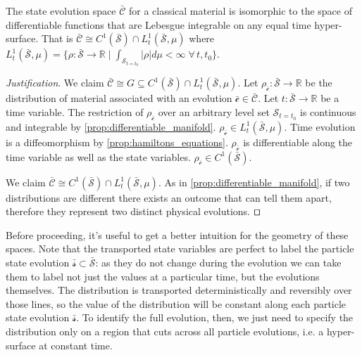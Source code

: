\documentclass[smallextended]{svjour3}
\numberwithin{equation}{section}
\newenvironment{justification}{\emph{Justification}.}{\hfill\(\qed\)}
\begin{document}
\begin{prop}\label{prop:state_evolution_space}
	The state evolution space $\bar{\mathcal{C}}$ for a classical material is isomorphic to the space of differentiable functions that are Lebesgue integrable on any equal time hyper-surface. That is $\bar{\mathcal{C}} \cong  C^1(\bar{\mathcal{S}})\cap L^1_t(\bar{\mathcal{S}}, \mu)$ where $L^1_t(\bar{\mathcal{S}}, \mu)=\{{\rho: \bar{\mathcal{S}} \rightarrow \mathbb{R}} \; | \; {\int_{\mathcal{S}_{t=t_0}} |\rho| d\mu < \infty} \; \forall \, t, t_0 \}$.
\end{prop}

\begin{justification}
	We claim $\bar{\mathcal{C}} \cong  G \subseteq C^1(\bar{\mathcal{S}})\cap L^1_t(\bar{\mathcal{S}}, \mu)$. Let $\rho_{\bar{\mathcal{c}}} : \bar{\mathcal{S}} \rightarrow \mathbb{R}$ be the distribution of material associated with an evolution $\bar{\mathcal{c}} \in \bar{\mathcal{C}}$. Let $t : \bar{\mathcal{S}} \rightarrow \mathbb{R}$ be a time variable. 
	The restriction of $\rho_{\bar{\mathcal{c}}}$ over an arbitrary level set $\mathcal{S}_{t=t_0}$ is continuous and integrable by \ref{prop:differentiable_manifold}. $\rho_{\bar{\mathcal{c}}} \in L^1_t(\bar{\mathcal{S}}, \mu)$. Time evolution is a diffeomorphism by \ref{prop:hamiltons_equations}. $\rho_{\bar{\mathcal{c}}}$ is differentiable along the time variable as well as the state variables. $\rho_{\bar{\mathcal{c}}} \in C^1(\bar{\mathcal{S}})$.
	
	We claim $\bar{\mathcal{C}} \cong  C^1(\bar{\mathcal{S}})\cap L^1_t(\bar{\mathcal{S}}, \mu)$. As in \ref{prop:differentiable_manifold}, if two distributions are different there exists an outcome that can tell them apart, therefore they represent two distinct physical evolutions.
\end{justification}

Before proceeding, it's useful to get a better intuition for the geometry of these spaces. Note that the transported state variables are perfect to label the particle state evolution $\bar{\mathcal{s}} \subset \bar{\mathcal{S}}$: as they do not change during the evolution we can take them to label not just the values at a particular time, but the evolutions themselves. The distribution is transported deterministically and reversibly over those lines, so the value of the distribution will be constant along each particle state evolution $\bar{\mathcal{s}}$. To identify the full evolution, then, we just need to specify the distribution only on a region that cuts across all particle evolutions, i.e. a hyper-surface at constant time.
\end{document}
